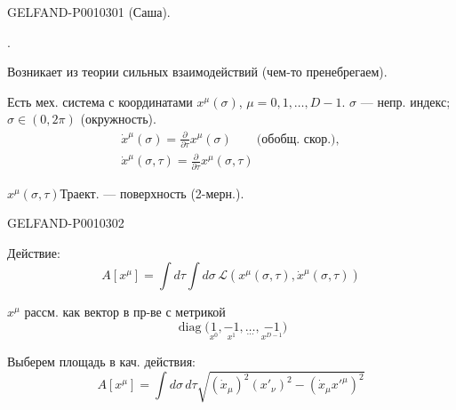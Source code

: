 \begin{GelfandAdjacentEvidence}{GELFAND-P001030}{1}
 (Саша).

.

Возникает из теории сильных взаимодействий (чем-то пренебрегаем).

Есть мех. система с координатами $x^\mu(\sigma)$, $\mu=0,1,\ldots,D-1$.
$\sigma$ --- непр. индекс; $\sigma\in(0,2\pi)$ (окружность).
\[
\begin{gathered}
\dot{x}^{\mu}(\sigma)=\frac{\partial}{\partial\tau}x^\mu(\sigma)
\qquad\text{(обобщ. скор.)},\\[.5ex]
\dot{x}^{\mu}(\sigma,\tau)=\frac{\partial}{\partial\tau}x^\mu(\sigma,\tau)
\end{gathered}
\]

$x^\mu(\sigma,\tau)$\qquad Траект. --- поверхность (2-мерн.).
\end{GelfandAdjacentEvidence}
\begin{GelfandAdjacentEvidence}{GELFAND-P001030}{2}


Действие:
\begin{equation*}
A[x^\mu]=\int d\tau\int d\sigma\,
\mathcal{L}(x^\mu(\sigma,\tau),\dot{x}^\mu(\sigma,\tau))
\tag{1}
\end{equation*}

$x^\mu$ рассм. как вектор в пр-ве с метрикой
\[
\operatorname{diag}\bigl(\underset{x^0}{1},\underset{x^1}{-1},
\underset{\ldots}{\ldots},\underset{x^{D-1}}{-1}\bigr)
\]

Выберем площадь в кач. действия:
\begin{equation*}
A[x^\mu]=\int d\sigma\,d\tau
\sqrt{(\dot{x}_\mu)^2(x'_\nu)^2-(\dot{x}_\mu x'^{\mu})^2}
\tag{2}
\end{equation*}
\end{GelfandAdjacentEvidence}
